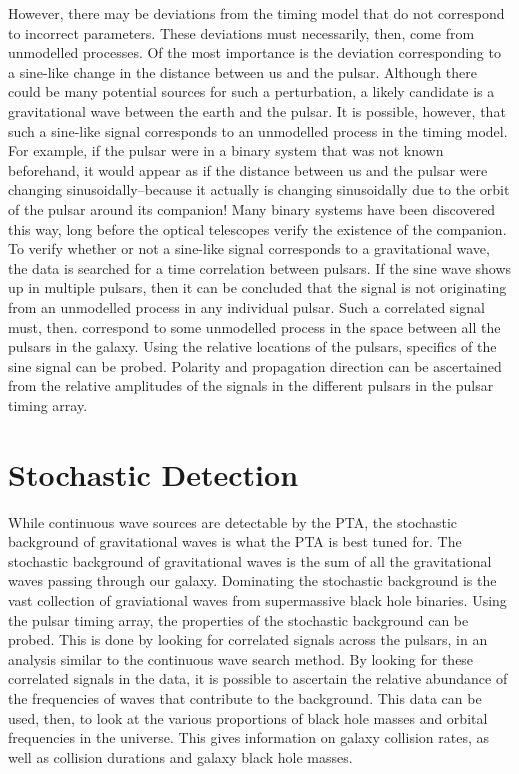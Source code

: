 \documentclass[12pt]{article}
\begin{document}
However, there may be deviations from the timing model that do not correspond to
incorrect parameters. These deviations must necessarily, then, come from
unmodelled processes. Of the most importance is the deviation corresponding to a
sine-like change in the distance between us and the pulsar. Although there could
be many potential sources for such a perturbation, a likely candidate is a
gravitational wave between the earth and the pulsar. It is possible, however,
that such a sine-like signal corresponds to an unmodelled process in the timing
model. For example, if the pulsar were in a binary system that was not known
beforehand, it would appear as if the distance between us and the pulsar were
changing sinusoidally--because it actually is changing sinusoidally due to the
orbit of the pulsar around its companion! Many binary systems have been
discovered this way, long before the optical telescopes verify the existence of
the companion.
\\
To verify whether or not a sine-like signal corresponds to a gravitational wave,
the data is searched for a time correlation between pulsars. If the sine wave
shows up in multiple pulsars, then it can be concluded that the signal is not
originating from an unmodelled process in any individual pulsar. Such a
correlated signal must, then. correspond to some unmodelled process in the space
between all the pulsars in the galaxy. Using the relative locations of the
pulsars, specifics of the sine signal can be probed. Polarity and propagation
direction can be ascertained from the relative amplitudes of the signals in the
different pulsars in the pulsar timing array.

\section{Stochastic Detection}
While continuous wave sources are detectable by the PTA, the stochastic
background of gravitational waves is what the PTA is best tuned for. The
stochastic background of gravitational waves is the sum of all the gravitational
waves passing through our galaxy. Dominating the stochastic background is the
vast collection of graviational waves from supermassive black hole binaries.
Using the pulsar timing array, the properties of the stochastic background can
be probed. This is done by looking for correlated signals across the pulsars, in
an analysis similar to the continuous wave search method. By looking for these
correlated signals in the data, it is possible to ascertain the relative
abundance of the frequencies of waves that contribute to the background. This
data can be used, then, to look at the various proportions of black hole masses
and orbital frequencies in the universe. This gives information on galaxy
collision rates, as well as collision durations and galaxy black hole masses.
\end{document}
